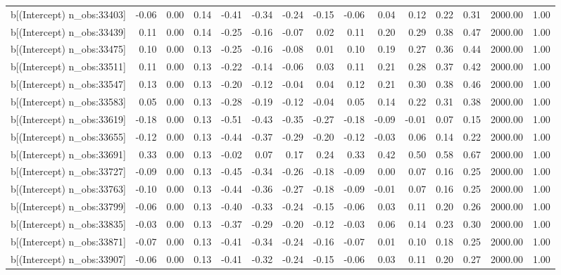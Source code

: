 \begin{table}[ht]
\begin{tabular}{rrrrrrrrrrrrrrr}
  b[(Intercept) n\_obs:33403] & -0.06 & 0.00 & 0.14 & -0.41 & -0.34 & -0.24 & -0.15 & -0.06 & 0.04 & 0.12 & 0.22 & 0.31 & 2000.00 & 1.00 \\ 
  b[(Intercept) n\_obs:33439] & 0.11 & 0.00 & 0.14 & -0.25 & -0.16 & -0.07 & 0.02 & 0.11 & 0.20 & 0.29 & 0.38 & 0.47 & 2000.00 & 1.00 \\ 
  b[(Intercept) n\_obs:33475] & 0.10 & 0.00 & 0.13 & -0.25 & -0.16 & -0.08 & 0.01 & 0.10 & 0.19 & 0.27 & 0.36 & 0.44 & 2000.00 & 1.00 \\ 
  b[(Intercept) n\_obs:33511] & 0.11 & 0.00 & 0.13 & -0.22 & -0.14 & -0.06 & 0.03 & 0.11 & 0.21 & 0.28 & 0.37 & 0.42 & 2000.00 & 1.00 \\ 
  b[(Intercept) n\_obs:33547] & 0.13 & 0.00 & 0.13 & -0.20 & -0.12 & -0.04 & 0.04 & 0.12 & 0.21 & 0.30 & 0.38 & 0.46 & 2000.00 & 1.00 \\ 
  b[(Intercept) n\_obs:33583] & 0.05 & 0.00 & 0.13 & -0.28 & -0.19 & -0.12 & -0.04 & 0.05 & 0.14 & 0.22 & 0.31 & 0.38 & 2000.00 & 1.00 \\ 
  b[(Intercept) n\_obs:33619] & -0.18 & 0.00 & 0.13 & -0.51 & -0.43 & -0.35 & -0.27 & -0.18 & -0.09 & -0.01 & 0.07 & 0.15 & 2000.00 & 1.00 \\ 
  b[(Intercept) n\_obs:33655] & -0.12 & 0.00 & 0.13 & -0.44 & -0.37 & -0.29 & -0.20 & -0.12 & -0.03 & 0.06 & 0.14 & 0.22 & 2000.00 & 1.00 \\ 
  b[(Intercept) n\_obs:33691] & 0.33 & 0.00 & 0.13 & -0.02 & 0.07 & 0.17 & 0.24 & 0.33 & 0.42 & 0.50 & 0.58 & 0.67 & 2000.00 & 1.00 \\ 
  b[(Intercept) n\_obs:33727] & -0.09 & 0.00 & 0.13 & -0.45 & -0.34 & -0.26 & -0.18 & -0.09 & 0.00 & 0.07 & 0.16 & 0.25 & 2000.00 & 1.00 \\ 
  b[(Intercept) n\_obs:33763] & -0.10 & 0.00 & 0.13 & -0.44 & -0.36 & -0.27 & -0.18 & -0.09 & -0.01 & 0.07 & 0.16 & 0.25 & 2000.00 & 1.00 \\ 
  b[(Intercept) n\_obs:33799] & -0.06 & 0.00 & 0.13 & -0.40 & -0.33 & -0.24 & -0.15 & -0.06 & 0.03 & 0.11 & 0.20 & 0.26 & 2000.00 & 1.00 \\ 
  b[(Intercept) n\_obs:33835] & -0.03 & 0.00 & 0.13 & -0.37 & -0.29 & -0.20 & -0.12 & -0.03 & 0.06 & 0.14 & 0.23 & 0.30 & 2000.00 & 1.00 \\ 
  b[(Intercept) n\_obs:33871] & -0.07 & 0.00 & 0.13 & -0.41 & -0.34 & -0.24 & -0.16 & -0.07 & 0.01 & 0.10 & 0.18 & 0.25 & 2000.00 & 1.00 \\ 
  b[(Intercept) n\_obs:33907] & -0.06 & 0.00 & 0.13 & -0.41 & -0.32 & -0.24 & -0.15 & -0.06 & 0.03 & 0.11 & 0.20 & 0.27 & 2000.00 & 1.00 \\ 

\end{tabular}
\end{table}
